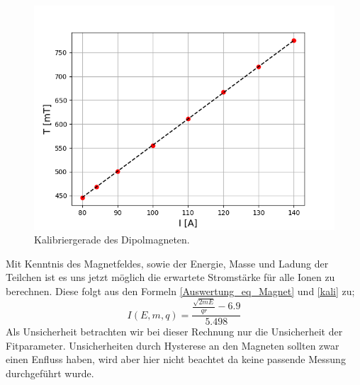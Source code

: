 \begin{figure}[H]
  \centering
  \includegraphics[width=0.95\linewidth]{Pictures/magnet.png}
  \caption{Kalibriergerade des Dipolmagneten.}
  \label{Magnet_kali}
\end{figure}

Mit Kenntnis des Magnetfeldes, sowie der Energie, Masse und Ladung der Teilchen ist es uns jetzt möglich die erwartete Stromstärke für alle Ionen zu berechnen.
Diese folgt aus den Formeln \ref{Auswertung_eq_Magnet} und \ref{kali} zu;
\begin{equation}
I(E, m, q) = \frac{\frac{{\sqrt{2mE}}}{qr}-\num{6.9}}{\num{5.498}}
\label{HE_ion}
\end{equation}
Als Unsicherheit betrachten wir bei dieser Rechnung nur die Unsicherheit der Fitparameter.
Unsicherheiten durch Hysterese an den Magneten sollten zwar einen Enfluss haben, wird aber hier nicht beachtet da keine passende Messung durchgeführt wurde.


